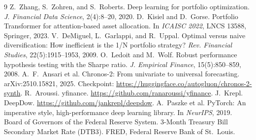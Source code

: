 \documentclass[10pt,twocolumn,letterpaper]{article}
\begin{document}
{\small\raggedright
\begin{thebibliography}{9}\setlength{\itemsep}{0pt} %
 Z.~Zhang, S.~Zohren, and S.~Roberts. Deep learning for portfolio
optimization. \emph{J. Financial Data Science}, 2(4):8--20, 2020.
 D.~Kisiel and D.~Gorse. Portfolio Transformer for attention-based
asset allocation. In \emph{ICAISC 2022}, LNCS 13588, Springer, 2023.
 V.~DeMiguel, L.~Garlappi, and R.~Uppal. Optimal versus naive
diversification: How inefficient is the 1/N portfolio strategy? \emph{Rev. Financial Studies},
22(5):1915--1953, 2009.
 O.~Ledoit and M.~Wolf. Robust performance hypothesis testing with the
Sharpe ratio. \emph{J. Empirical Finance}, 15(5):850--859, 2008.
 A.~F.~Ansari et al. Chronos-2: From univariate to universal
forecasting. arXiv:2510.15821, 2025. Checkpoint:
\url{https://huggingface.co/autogluon/chronos-2-synth}.
 R.~Aroussi. yfinance. \url{https://github.com/ranaroussi/yfinance}.
 J.~Krepl. DeepDow. \url{https://github.com/jankrepl/deepdow}.
 A.~Paszke et al. PyTorch: An imperative style, high-performance deep learning
library. In \emph{NeurIPS}, 2019.
 Board of Governors of the Federal Reserve System. 3-Month Treasury Bill
Secondary Market Rate (DTB3). FRED, Federal Reserve Bank of St.~Louis.
\end{thebibliography}
}
\end{document}

